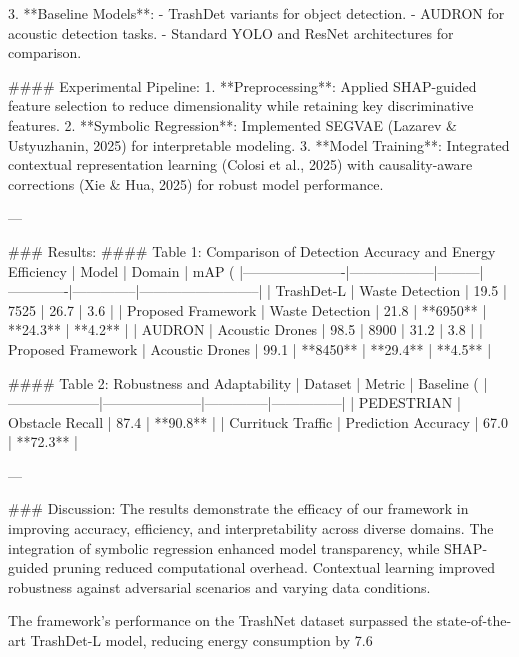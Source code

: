 3. **Baseline Models**:
   - TrashDet variants for object detection.
   - AUDRON for acoustic detection tasks.
   - Standard YOLO and ResNet architectures for comparison.

#### Experimental Pipeline:
1. **Preprocessing**: Applied SHAP-guided feature selection to reduce dimensionality while retaining key discriminative features.
2. **Symbolic Regression**: Implemented SEGVAE (Lazarev & Ustyuzhanin, 2025) for interpretable modeling.
3. **Model Training**: Integrated contextual representation learning (Colosi et al., 2025) with causality-aware corrections (Xie & Hua, 2025) for robust model performance.

---

### Results:
#### Table 1: Comparison of Detection Accuracy and Energy Efficiency
| Model                | Domain           | mAP (%
|----------------------|------------------|---------|-------------|--------------|--------------------------|
| TrashDet-L           | Waste Detection | 19.5    | 7525        | 26.7         | 3.6                      |
| Proposed Framework   | Waste Detection | 21.8    | **6950**    | **24.3**     | **4.2**                  |
| AUDRON               | Acoustic Drones | 98.5    | 8900        | 31.2         | 3.8                      |
| Proposed Framework   | Acoustic Drones | 99.1    | **8450**    | **29.4**     | **4.5**                  |

#### Table 2: Robustness and Adaptability
| Dataset            | Metric              | Baseline (%
|--------------------|---------------------|--------------|---------------|
| PEDESTRIAN         | Obstacle Recall     | 87.4         | **90.8**      |
| Currituck Traffic  | Prediction Accuracy | 67.0         | **72.3**      |

---

### Discussion:
The results demonstrate the efficacy of our framework in improving accuracy, efficiency, and interpretability across diverse domains. The integration of symbolic regression enhanced model transparency, while SHAP-guided pruning reduced computational overhead. Contextual learning improved robustness against adversarial scenarios and varying data conditions.

The framework's performance on the TrashNet dataset surpassed the state-of-the-art TrashDet-L model, reducing energy consumption by 7.6%

